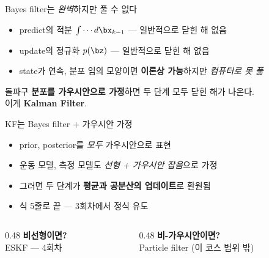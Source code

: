 \begin{frame}{Bayes filter는 \emph{완벽}하지만 풀 수 없다}
  \begin{itemize}
    \item predict의 적분 $\int \cdots d\bx_{k-1}$ — 일반적으로 닫힌 해 없음
    \item update의 정규화 $p(\bz)$ — 일반적으로 닫힌 해 없음
    \item state가 연속, 분포 임의 모양이면 \textbf{이론상 가능}하지만 \emph{컴퓨터로 못 풂}
  \end{itemize}
  \pause
  \vspace{0.5em}
  \begin{block}{돌파구}
    \textbf{분포를 가우시안으로 가정}하면 두 단계 모두 닫힌 해가 나온다. \\
    이게 \textbf{Kalman Filter}.
  \end{block}
\end{frame}

\begin{frame}{KF는 Bayes filter + 가우시안 가정}
  \begin{itemize}
    \item prior, posterior를 \emph{모두} 가우시안으로 표현
    \item 운동 모델, 측정 모델도 \emph{선형 + 가우시안 잡음}으로 가정
    \item 그러면 두 단계가 \textbf{평균과 공분산의 업데이트}로 환원됨
    \item 식 5줄로 끝 — 3회차에서 정식 유도
  \end{itemize}
  \pause
  \vspace{0.4em}
  \begin{columns}[T]
    \begin{column}{0.48\textwidth}
      \textbf{비선형이면?}\\
      ESKF — 4회차
    \end{column}
    \begin{column}{0.48\textwidth}
      \textbf{비-가우시안이면?}\\
      Particle filter (이 코스 범위 밖)
    \end{column}
  \end{columns}
\end{frame}


